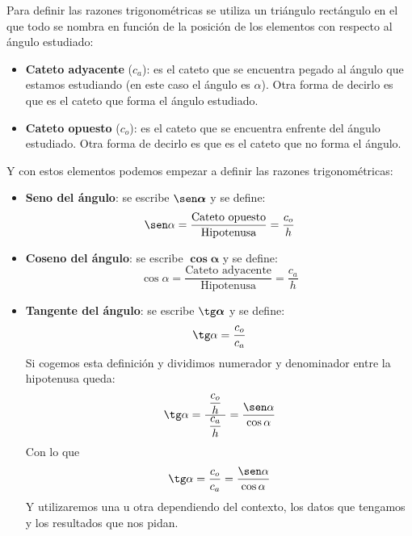 \documentclass[a4paper,11pt,answers]{exam}
\newcommand\ddfrac[2]{\frac{\displaystyle #1}{\displaystyle #2}}
\begin{document}
Para definir las razones trigonométricas se utiliza un triángulo rectángulo en el que todo se nombra en función de la posición de los elementos con respecto al ángulo estudiado:
\begin{itemize}
\item \textbf{Cateto adyacente} ($c_a$): es el cateto que se encuentra pegado al ángulo que estamos estudiando (en este caso el ángulo es $\alpha$). Otra forma de decirlo es que es el cateto que forma el ángulo estudiado.
\item \textbf{Cateto opuesto} ($c_o$): es el cateto que se encuentra enfrente del ángulo estudiado. Otra forma de decirlo es que es el cateto que no forma el ángulo.
\end{itemize}
Y con estos elementos podemos empezar a definir las razones trigonométricas:
\begin{itemize}
\item \textbf{Seno del ángulo}: se escribe $\boldsymbol{\sen \alpha}$ y se define:
  \[\sen \alpha = \frac{\text{Cateto opuesto}}{\text{Hipotenusa}} = \frac{c_o}{h}\]
\item \textbf{Coseno del ángulo}: se escribe $\boldsymbol{\cos \alpha}$ y se define:
  \[\cos \alpha = \frac{\text{Cateto adyacente}}{\text{Hipotenusa}} = \frac{c_a}{h}\]
\item \textbf{Tangente del ángulo}: se escribe $\boldsymbol{\tg \alpha}$ y se define:
  \[\tg \alpha = \frac{c_o}{c_a}\]
  Si cogemos esta definición y dividimos numerador y denominador entre la hipotenusa queda:
  \[\tg \alpha = \ddfrac{\ \frac{c_o}{h}\ }{\frac{c_a}{h}} = \frac{\sen \alpha}{\cos \alpha}\]
  Con lo que
  \[\tg \alpha = \frac{c_o}{c_a} =\frac{\sen \alpha}{\cos \alpha}\]
  Y utilizaremos una u otra dependiendo del contexto, los datos que tengamos y los resultados que nos pidan.
\end{itemize}
\end{document}
